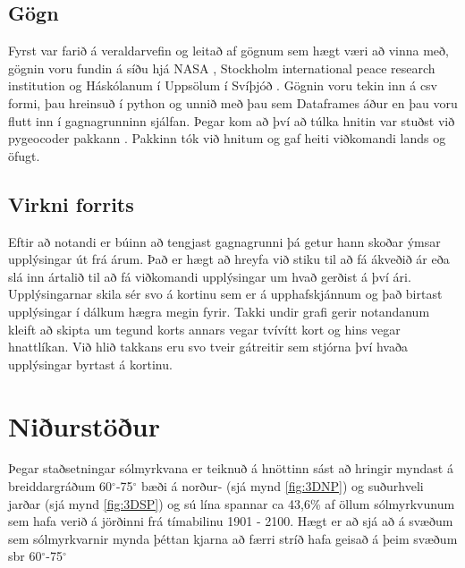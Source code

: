 \documentclass[12pt, git, final]{rureport}
\begin{document}

\subsection{Gögn}
Fyrst var farið á veraldarvefin og leitað af gögnum sem hægt væri að vinna með, gögnin voru fundin á síðu hjá NASA \cite{Eclipse}, Stockholm international peace research institution \cite{weapon} og Háskólanum í Uppsölum í Svíþjóð \cite{conflict}. Gögnin voru tekin inn á csv formi, þau hreinsuð í python og unnið með þau sem Dataframes áður en þau voru flutt inn í gagnagrunninn sjálfan. Þegar kom að því að túlka hnitin var stuðst við pygeocoder pakkann \cite{geocoder}. Pakkinn tók við hnitum og gaf heiti viðkomandi lands og öfugt.





\subsection{Virkni forrits}\label{virkni}
Eftir að notandi er búinn að tengjast gagnagrunni þá getur hann skoðar ýmsar upplýsingar út frá árum. Það er hægt að hreyfa við stiku til að fá ákveðið ár eða slá inn ártalið til að fá viðkomandi upplýsingar um hvað gerðist á því ári. Upplýsingarnar skila sér svo á kortinu sem er á upphafskjánnum og það birtast upplýsingar í dálkum hægra megin fyrir. Takki undir grafi gerir notandanum kleift að skipta um tegund korts annars vegar tvívítt kort og hins vegar hnattlíkan. Við hlið takkans eru svo tveir gátreitir sem stjórna því hvaða upplýsingar byrtast á kortinu.


\section{Niðurstöður}\label{nidurstodur}

Þegar staðsetningar sólmyrkvana er teiknuð á hnöttinn sást að hringir myndast á breiddargráðum 60$^{\circ}$-75$^{\circ}$ bæði á norður- (sjá mynd \ref{fig:3DNP}) og suðurhveli jarðar (sjá mynd \ref{fig:3DSP}) og sú lína spannar ca 43,6\% af öllum sólmyrkvunum sem hafa verið á jörðinni frá tímabilinu 1901 - 2100. Hægt er að sjá að á svæðum sem sólmyrkvarnir mynda þéttan kjarna að færri stríð hafa geisað á þeim svæðum sbr 60$^{\circ}$-75$^{\circ}$
\pagebreak
\end{document}
